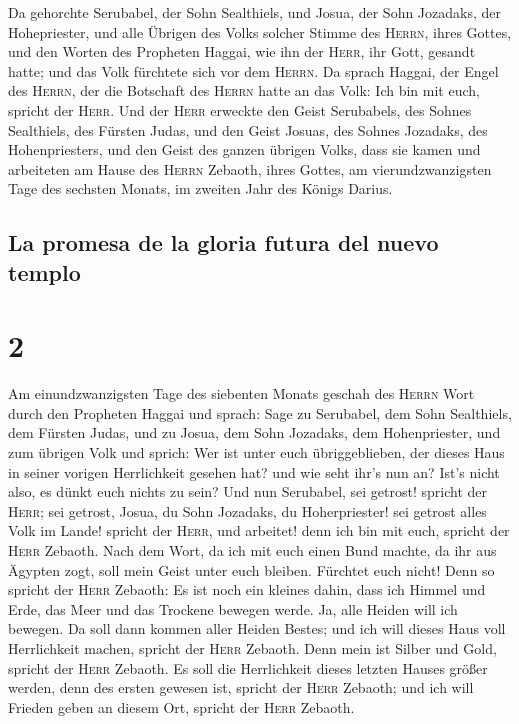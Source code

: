  Da gehorchte Serubabel, der Sohn Sealthiels, und Josua,
der Sohn Jozadaks, der Hohepriester, und alle Übrigen des Volks solcher
Stimme des \textsc{Herrn}, ihres Gottes, und den Worten des Propheten
Haggai, wie ihn der \textsc{Herr}, ihr Gott, gesandt hatte; und das Volk
fürchtete sich vor dem \textsc{Herrn}.  Da sprach Haggai,
der Engel des \textsc{Herrn}, der die Botschaft des \textsc{Herrn} hatte
an das Volk: Ich bin mit euch, spricht der \textsc{Herr}.
 Und der \textsc{Herr} erweckte den Geist Serubabels, des
Sohnes Sealthiels, des Fürsten Judas, und den Geist Josuas, des Sohnes
Jozadaks, des Hohenpriesters, und den Geist des ganzen übrigen Volks,
dass sie kamen und arbeiteten am Hause des \textsc{Herrn} Zebaoth, ihres
Gottes,  am vierundzwanzigsten Tage des sechsten Monats,
im zweiten Jahr des Königs Darius.

\hypertarget{la-promesa-de-la-gloria-futura-del-nuevo-templo}{%
\subsection{La promesa de la gloria futura del nuevo
templo}\label{la-promesa-de-la-gloria-futura-del-nuevo-templo}}

\hypertarget{section-1}{%
\section{2}\label{section-1}}

 Am einundzwanzigsten Tage des siebenten Monats geschah
des \textsc{Herrn} Wort durch den Propheten Haggai und sprach:
 Sage zu Serubabel, dem Sohn Sealthiels, dem Fürsten
Judas, und zu Josua, dem Sohn Jozadaks, dem Hohenpriester, und zum
übrigen Volk und sprich:  Wer ist unter euch
übriggeblieben, der dieses Haus in seiner vorigen Herrlichkeit gesehen
hat? und wie seht ihr's nun an? Ist's nicht also, es dünkt euch nichts
zu sein?  Und nun Serubabel, sei getrost! spricht der
\textsc{Herr}; sei getrost, Josua, du Sohn Jozadaks, du Hoherpriester!
sei getrost alles Volk im Lande! spricht der \textsc{Herr}, und
arbeitet! denn ich bin mit euch, spricht der \textsc{Herr} Zebaoth.
 Nach dem Wort, da ich mit euch einen Bund machte, da ihr
aus Ägypten zogt, soll mein Geist unter euch bleiben. Fürchtet euch
nicht!  Denn so spricht der \textsc{Herr} Zebaoth: Es ist
noch ein kleines dahin, dass ich Himmel und Erde, das Meer und das
Trockene bewegen werde.  Ja, alle Heiden will ich bewegen.
Da soll dann kommen aller Heiden Bestes; und ich will dieses Haus voll
Herrlichkeit machen, spricht der \textsc{Herr} Zebaoth. 
Denn mein ist Silber und Gold, spricht der \textsc{Herr} Zebaoth.
 Es soll die Herrlichkeit dieses letzten Hauses größer
werden, denn des ersten gewesen ist, spricht der \textsc{Herr} Zebaoth;
und ich will Frieden geben an diesem Ort, spricht der \textsc{Herr}
Zebaoth.

